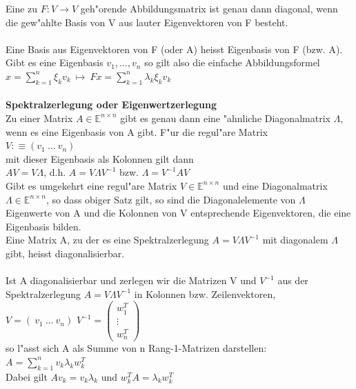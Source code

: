 \documentclass[10pt, a4paper, twocolumn]{scrartcl}
\begin{document}
Eine zu $F: V \rightarrow V$ geh"orende Abbildungsmatrix ist genau dann diagonal, wenn die gew"ahlte Basis von V aus lauter Eigenvektoren von F besteht.\\\\

Eine Basis aus Eigenvektoren von F (oder A) heisst Eigenbasis von F (bzw. A).\\
Gibt es eine Eigenbasis $v_1,\ldots,v_n$ so gilt also die einfache Abbildungsformel\\
$x=\sum^n_{k=1}\xi_k v_k\:\mapsto\:Fx=\sum^n_{k=1}\lambda_k\xi_k v_k$\\\\

{\bf Spektralzerlegung oder Eigenwertzerlegung}\\
Zu einer Matrix $A \in \mathbb{E}^{n\times n}$ gibt es genau dann eine "ahnliche Diagonalmatrix $\Lambda$, wenn es eine Eigenbasis von A gibt. F"ur die regul"are Matrix\\
$V:\equiv(v_1\:\ldots\:v_n)$\\
mit dieser Eigenbasis als Kolonnen gilt dann\\
$AV=V\Lambda$, d.h. $A=V\Lambda V^{-1}$ bzw. {\bf $\Lambda=V^{-1}AV$}\\
Gibt es umgekehrt eine regul"are Matrix $V \in \mathbb{E}^{n\times n}$ und eine Diagonalmatrix $\Lambda \in \mathbb{E}^{n \times n}$, so dass obiger Satz gilt, so sind die Diagonalelemente von $\Lambda$ Eigenwerte von A und die Kolonnen von V entsprechende Eigenvektoren, die eine Eigenbasis bilden.\\
Eine Matrix A, zu der es eine Spektralzerlegung $A=V\Lambda V^{-1}$ mit diagonalem $\Lambda$ gibt, heisst diagonalisierbar.\\\\

Ist A diagonalisierbar und zerlegen wir die Matrizen V und $V^{-1}$ aus der Spektralzerlegung $A=V\Lambda V^{-1}$ in Kolonnen bzw. Zeilenvektoren,\\
$V=(\:v_1\:\ldots\:v_n)$
$V^{-1}=
\left ( 
\begin{array}{c}
w^T_1 \\
\vdots \\ 
w^T_n
\end{array}
\right )
$\\

so l"asst sich A als Summe von n Rang-1-Matrizen darstellen:\\
$A=\sum^n_{k=1}v_k \lambda_k w_k^T$\\
Dabei gilt $Av_k=v_k\lambda_k$ und $w^T_kA=\lambda_k w^T_k$\\\\
\end{document}

